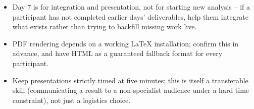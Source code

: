 \documentclass[11pt]{article}
\providecommand{\tightlist}{%
  \setlength{\itemsep}{0pt}\setlength{\parskip}{0pt}}
\begin{document}
\begin{itemize}
\tightlist
\item
  Day 7 is for integration and presentation, not for starting new
  analysis -- if a participant has not completed earlier days'
  deliverables, help them integrate what exists rather than trying to
  backfill missing work live.
\item
  PDF rendering depends on a working LaTeX installation; confirm this in
  advance, and have HTML as a guaranteed fallback format for every
  participant.
\item
  Keep presentations strictly timed at five minutes; this is itself a
  transferable skill (communicating a result to a non-specialist
  audience under a hard time constraint), not just a logistics choice.
\end{itemize}
\end{document}
